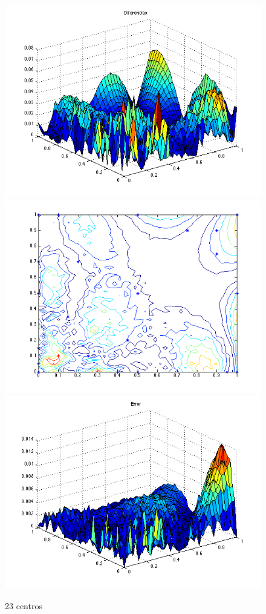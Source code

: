 \documentclass[11pt,a4paper]{article}
\begin{document}
\begin{figure}[H]
\centering

\includegraphics[scale=0.35]{diferencias23.png}
\includegraphics[scale=0.35]{centros23.png}
\includegraphics[scale=0.35]{error23.png}
\caption{23 centros}
\end{figure}
\end{document}
